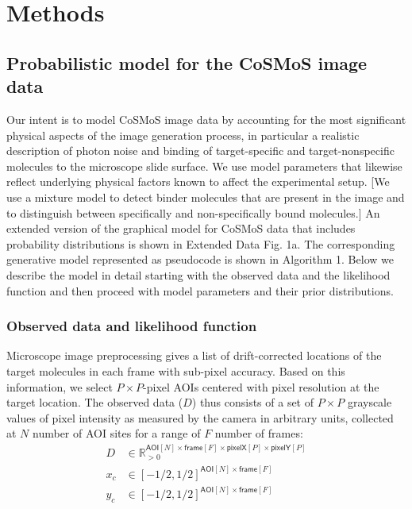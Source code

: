 \section*{Methods}

\subsection*{Probabilistic model for the CoSMoS image data} 

Our intent is to model CoSMoS image data by accounting for the most significant physical aspects of the image generation process, in particular a realistic description of photon noise and binding of target-specific and target-nonspecific molecules to the microscope slide surface. We use model parameters that likewise reflect underlying physical factors known to affect the experimental setup. [We use a mixture model to detect binder molecules that are present in the image and to distinguish between specifically and non-specifically bound molecules.] An extended version of the graphical model for CoSMoS data that includes probability distributions is shown in Extended Data Fig. 1a. The corresponding generative model represented as pseudocode is shown in Algorithm 1. Below we describe the model in detail starting with the observed data and the likelihood function and then proceed with model parameters and their prior distributions.

\subsubsection*{Observed data and likelihood function}

Microscope image preprocessing gives a list of drift-corrected locations of the target molecules in each frame with sub-pixel accuracy. Based on this information, we select $P \times P$-pixel AOIs centered with pixel resolution at the target location. The observed data ($D$) thus consists of a set of $P \times P$ grayscale values of pixel intensity as measured by the camera in arbitrary units, collected at $N$ number of AOI sites for a range of $F$ number of frames:
%
\begin{subequations}
\begin{align}
    D &\in \mathbb{R}_{>0}^{\mathsf{AOI}[N] \times \mathsf{frame}[F] \times \mathsf{pixelX}[P] \times \mathsf{pixelY}[P]} \\
    x_c &\in [-1/2, 1/2]^{\mathsf{AOI}[N] \times \mathsf{frame}[F]} \\
    y_c &\in [-1/2, 1/2]^{\mathsf{AOI}[N] \times \mathsf{frame}[F]}
\end{align}
\end{subequations}

